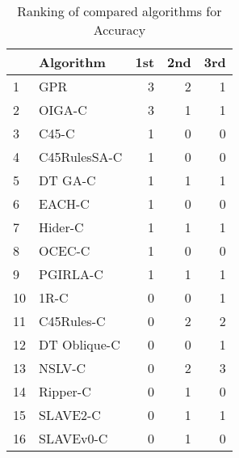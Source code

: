 \begin{table}
\footnotesize
\caption{Ranking of compared algorithms for Accuracy}
\label{tab:places Accuracy}
\begin{tabular}{llrrr}
\hline
 & Algorithm & 1st & 2nd & 3rd \\
\hline
1 & GPR & 3 & 2 & 1 \\
2 & OIGA-C & 3 & 1 & 1 \\
3 & C45-C & 1 & 0 & 0 \\
4 & C45RulesSA-C & 1 & 0 & 0 \\
5 & DT GA-C & 1 & 1 & 1 \\
6 & EACH-C & 1 & 0 & 0 \\
7 & Hider-C & 1 & 1 & 1 \\
8 & OCEC-C & 1 & 0 & 0 \\
9 & PGIRLA-C & 1 & 1 & 1 \\
10 & 1R-C & 0 & 0 & 1 \\
11 & C45Rules-C & 0 & 2 & 2 \\
12 & DT Oblique-C & 0 & 0 & 1 \\
13 & NSLV-C & 0 & 2 & 3 \\
14 & Ripper-C & 0 & 1 & 0 \\
15 & SLAVE2-C & 0 & 1 & 1 \\
16 & SLAVEv0-C & 0 & 1 & 0 \\
\hline
\end{tabular}
\end{table}
